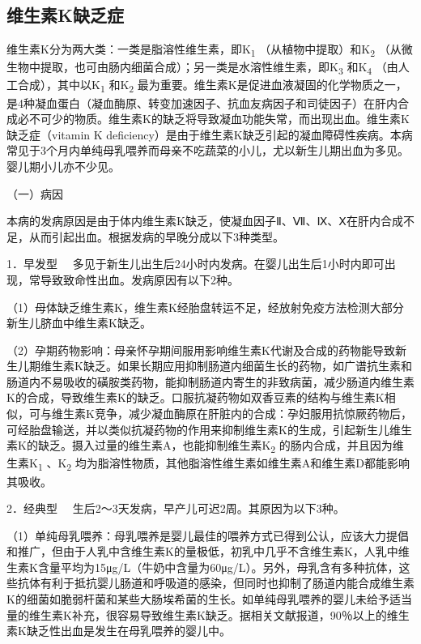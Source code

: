\hypertarget{text00003.htmlux5cux23mllj19}{%
\subsection{维生素K缺乏症}\label{text00003.htmlux5cux23mllj19}}

维生素K分为两大类：一类是脂溶性维生素，即K\textsubscript{1}
（从植物中提取）和K\textsubscript{2}
（从微生物中提取，也可由肠内细菌合成）；另一类是水溶性维生素，即K\textsubscript{3}
和K\textsubscript{4} （由人工合成），其中以K\textsubscript{1}
和K\textsubscript{2}
最为重要。维生素K是促进血液凝固的化学物质之一，是4种凝血蛋白（凝血酶原、转变加速因子、抗血友病因子和司徒因子）在肝内合成必不可少的物质。维生素K的缺乏将导致凝血功能失常，而出现出血。维生素K缺乏症（vitamin
K
deficiency）是由于维生素K缺乏引起的凝血障碍性疾病。本病常见于3个月内单纯母乳喂养而母亲不吃蔬菜的小儿，尤以新生儿期出血为多见。婴儿期小儿亦不少见。

（一）病因

本病的发病原因是由于体内维生素K缺乏，使凝血因子Ⅱ、Ⅶ、Ⅸ、Ⅹ在肝内合成不足，从而引起出血。根据发病的早晚分成以下3种类型。

{1．早发型}
　多见于新生儿出生后24小时内发病。在婴儿出生后1小时内即可出现，常导致致命性出血。发病原因有以下2种。

（1）母体缺乏维生素K，维生素K经胎盘转运不足，经放射免疫方法检测大部分新生儿脐血中维生素K缺乏。

（2）孕期药物影响：母亲怀孕期间服用影响维生素K代谢及合成的药物能导致新生儿期维生素K缺乏。如果长期应用抑制肠道内细菌生长的药物，如广谱抗生素和肠道内不易吸收的磺胺类药物，能抑制肠道内寄生的非致病菌，减少肠道内维生素K的合成，导致维生素K的缺乏。口服抗凝药物如双香豆素的结构与维生素K相似，可与维生素K竞争，减少凝血酶原在肝脏内的合成：孕妇服用抗惊厥药物后，可经胎盘输送，并以类似抗凝药物的作用来抑制维生素K的生成，引起新生儿维生素K的缺乏。摄入过量的维生素A，也能抑制维生素K\textsubscript{2}
的肠内合成，并且因为维生素K\textsubscript{1} 、K\textsubscript{2}
均为脂溶性物质，其他脂溶性维生素如维生素A和维生素D都能影响其吸收。

{2．经典型} 　生后2～3天发病，早产儿可迟2周。其原因为以下3种。

（1）单纯母乳喂养：母乳喂养是婴儿最佳的喂养方式已得到公认，应该大力提倡和推广，但由于人乳中含维生素K的量极低，初乳中几乎不含维生素K，人乳中维生素K含量平均为15μg/L（牛奶中含量为60μg/L）。另外，母乳含有多种抗体，这些抗体有利于抵抗婴儿肠道和呼吸道的感染，但同时也抑制了肠道内能合成维生素K的细菌如脆弱杆菌和某些大肠埃希菌的生长。如单纯母乳喂养的婴儿未给予适当量的维生素K补充，很容易导致维生素K缺乏。据相关文献报道，90％以上的维生素K缺乏性出血是发生在母乳喂养的婴儿中。

